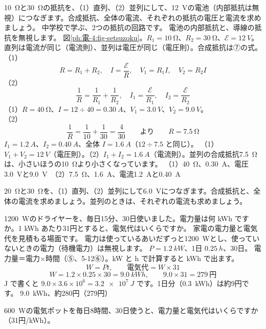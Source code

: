 \label{ph:電-4:ex6}
\begin{phreidai}
\qty{10}{\ohm}と\qty{30}{\ohm}の抵抗を、（1）直列、（2）並列にして、\qty{12}{V}の電池（内部抵抗は無視）につなぎます。合成抵抗、全体の電流、それぞれの抵抗の電圧と電流を求めましょう。
\phbamen
中学校で学ぶ、2つの抵抗の回路です。
\phmushi
電池の内部抵抗と、導線の抵抗を無視します。
\phzu
図\ref{ph:電-4:fig-setsuzoku}。$R_1=\qty{10}{\ohm}$、$R_2=\qty{30}{\ohm}$、$\mathcal E=\qty{12}{V}$。
\phriyu
直列は電流が同じ（電流則）、並列は電圧が同じ（電圧則）。合成抵抗は⑦の式。
\phtateru
（1）\[R=R_1+R_2,\quad I=\frac{\mathcal E}{R},\quad V_1=R_1I,\quad V_2=R_2I\]
（2）\[\frac1R=\frac1{R_1}+\frac1{R_2},\quad I_1=\frac{\mathcal E}{R_1},\quad I_2=\frac{\mathcal E}{R_2}\]
\phtoku
（1）$R=\qty{40}{\ohm}$、$I=12\div40=\qty{0.30}{A}$、$V_1=\qty{3.0}{V}$、$V_2=\qty{9.0}{V}$。\\
（2）\[\frac1R=\frac1{10}+\frac1{30}=\frac4{30}\qquad\text{より}\qquad R=\qty{7.5}{\ohm}\]$I_1=\qty{1.2}{A}$、$I_2=\qty{0.40}{A}$、全体 $I=\qty{1.6}{A}$（$12\div7.5$ と同じ）。
\phtashikame
（1）$V_1+V_2=\qty{12}{V}$（電圧則）。（2）$I_1+I_2=\qty{1.6}{A}$（電流則）。並列の合成抵抗\qty{7.5}{\ohm}は、小さいほうの\qty{10}{\ohm}より小さくなっています。
\kotae （1）\qty{40}{\ohm}、\qty{0.30}{A}、電圧\qty{3.0}{V}と\qty{9.0}{V}　（2）\qty{7.5}{\ohm}、\qty{1.6}{A}、電流\qty{1.2}{A}と\qty{0.40}{A}
\end{phreidai}
\begin{jibun}
\qty{20}{\ohm}と\qty{30}{\ohm}を、（1）直列、（2）並列にして\qty{6.0}{V}につなぎます。合成抵抗と、全体の電流を求めましょう。並列のときは、それぞれの電流も求めましょう。
\end{jibun}

\label{ph:電-4:ex7}
\begin{phreidai}
\qty{1200}{W}のドライヤーを、毎日15分、30日使いました。電力量は何 kWh ですか。1 kWh あたり31円とすると、電気代はいくらですか。
\phbamen
家電の電力量と電気代を見積もる場面です。
\phmushi
電力は使っているあいだずっと\qty{1200}{W}とし、使っていないときの電力（待機電力）は無視します。
\phzu
$P=\qty{1.2}{kW}$、1日 $\qty{0.25}{h}$、30日。
\phriyu
電力量＝電力×時間（⑤、5-12⑥）。kW と h で計算すると kWh で出ます。
\phtateru
\[W=Pt,\qquad\text{電気代}=W\times31\]
\phtoku
\[W=1.2\times0.25\times30=\qty{9.0}{kWh},\qquad9.0\times31=279\ \text{円}\]
\phtashikame
J で書くと $9.0\times3.6\times10^6=\qty{3.2e7}{J}$ です。1日分（\qty{0.3}{kWh}）は約9円です。
\kotae \qty{9.0}{kWh}、約280円（279円）
\end{phreidai}
\begin{jibun}
\qty{600}{W}の電気ポットを毎日8時間、30日使うと、電力量と電気代はいくらですか（31円/kWh）。
\end{jibun}

